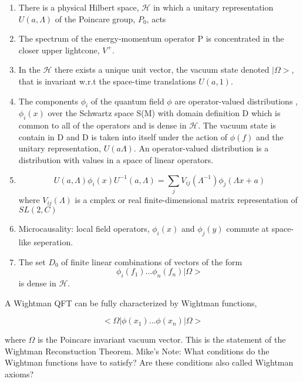 \documentclass{article}
\newcommand{\1}{\mathbbm{1}}
\theoremstyle{plain}
\theoremstyle{definition}
\numberwithin{equation}{section}
\newcommand\MRD[1]{{\color{red} Mike's Note: #1}}
\begin{document}
\begin{enumerate}
    \item There is a physical Hilbert space, $\mathcal{H}$ in which a unitary representation $U(a, \Lambda)$ of the Poincare group,  $P_0$,  acts
    \item The spectrum of the energy-momentum operator P is concentrated in the closer upper lightcone, $V^+$. 
    \item In the $\mathcal{H}$ there exists a unique unit vector, the vacuum state denoted $|\Omega>$, that is invariant w.r.t the space-time translations $U(a,1)$.
    \item The components $\phi_i$ of the quantum field $ \phi$ are operator-valued distributions , $\phi_i(x)$ over the Schwartz space S(M) with domain definition D which is common to all of the operators and is dense in $\mathcal{H}$. The vacuum state is contain in D and D is taken into itself under the action of $\phi(f)$ and the unitary representation, $U(a\Lambda)$. An operator-valued distribution is a distribution with values in a space of linear operators. 
    \item \begin{equation}
        U(a, \Lambda) \phi_i(x) U^{-1}(a, \Lambda)= \sum_j V_{ij} (\Lambda^{-1}) \phi_j(\Lambda x + a)
    \end{equation}
    where $V_{ij}(\Lambda)$ is a cmplex or real finite-dimensional matrix representation of $SL(2,C)$
    \item Microcausality: local field operators, $\phi_i(x)$ and $\phi_j(y)$ commute at space-like seperation. 
    \item The set $D_0$ of finite linear combinations of vectors of the form 
    \begin{equation}
        \phi_i(f_1) \ldots \phi_n(f_n) |\Omega>
    \end{equation}
    is dense in $\mathcal{H}$. 
\end{enumerate}

A Wightman QFT can be fully characterized by Wightman functions, 

\begin{equation}
    < \Omega | \phi(x_1) 
    \ldots \phi(x_n)| \Omega > 
\end{equation}

where $\Omega$ is the Poincare invariant vacuum vector. This is the statement of the Wightman Reconstuction Theorem. 
\MRD{What conditions do the Wightman functions have to satisfy?  Are these conditions also called Wightman axioms?}
\end{document}
